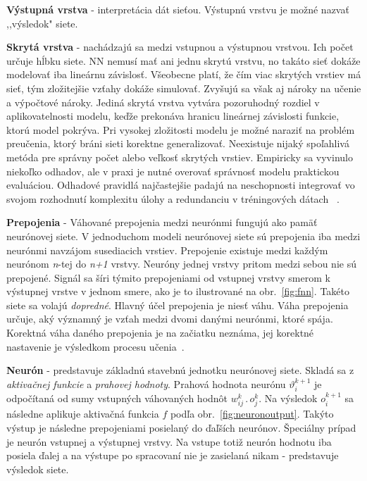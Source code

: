 \textbf{Výstupná vrstva} - interpretácia dát sieťou. Výstupnú vrstvu je možné nazvať ,,výsledok"  siete.
\noindent

\textbf{Skrytá vrstva} - nachádzajú sa medzi vstupnou a výstupnou vrstvou. Ich počet určuje hĺbku siete. NN nemusí mať ani jednu skrytú vrstvu, no takáto sieť dokáže modelovať iba lineárnu závislosť. Všeobecne platí, že čím viac skrytých vrstiev má sieť, tým zložitejšie vzťahy dokáže simulovať. Zvyšujú sa však aj nároky na učenie a výpočtové nároky. Jediná skrytá vrstva vytvára pozoruhodný rozdiel v aplikovatelnosti modelu, keďže prekonáva hranicu lineárnej závislosti funkcie, ktorú model pokrýva. Pri vysokej zložitosti modelu je možné naraziť na problém preučenia, ktorý bráni sieti korektne generalizovať. Neexistuje nijaký spoľahlivá metóda pre správny počet alebo veľkosť skrytých vrstiev. Empiricky sa vyvinulo niekoľko odhadov, ale v praxi je nutné overovať správnosť modelu praktickou evaluáciou. Odhadové pravidlá najčastejšie padajú na neschopnosti integrovať vo svojom rozhodnutí komplexitu úlohy a redundanciu v tréningových dátach ~\cite{Goodfellow-et-al-2016-Book}.
\noindent

\textbf{Prepojenia} - Váhované prepojenia medzi neurónmi fungujú ako pamäť neurónovej siete. V jednoduchom modeli neurónovej siete sú prepojenia iba medzi neurónmi navzájom susediacich vrstiev. Prepojenie existuje medzi každým neurónom \textit{n}-tej do \textit{n+1} vrstvy. Neuróny jednej vrstvy pritom medzi sebou nie sú prepojené. Signál sa šíri týmito prepojeniami od vstupnej vrstvy smerom k výstupnej vrstve v jednom smere, ako je to ilustrované na obr.~\ref{fig:fnn}. Takéto siete sa volajú \textit{dopredné}. Hlavný účel prepojenia je niesť váhu. Váha prepojenia určuje, aký významný je vzťah medzi dvomi danými neurónmi, ktoré spája. Korektná váha daného prepojenia je na začiatku neznáma, jej korektné nastavenie je výsledkom procesu učenia~\cite{Goodfellow-et-al-2016-Book}.
\noindent

\textbf{Neurón} - predstavuje základnú stavebnú jednotku neurónovej siete. Skladá sa z \textit{aktivačnej funkcie} a \textit{prahovej hodnoty}. Prahová hodnota neurónu $\vartheta _{i}^{k+1}$  je odpočítaná od sumy vstupných váhovaných hodnôt $ w_{ij}^{k}\, .\, o_{j}^{k}$. 
\newline
Na výsledok $o_{i}^{k+1}$ sa následne aplikuje aktivačná funkcia $f$ podľa obr.~\ref{fig:neuronoutput}. Takýto výstup je následne prepojeniami posielaný do ďaľších neurónov. Špeciálny prípad je neurón vstupnej a výstupnej vrstvy. Na vstupe totiž neurón hodnotu iba posiela ďalej a na výstupe po spracovaní nie je zasielaná nikam - predstavuje výsledok siete.
\newline



